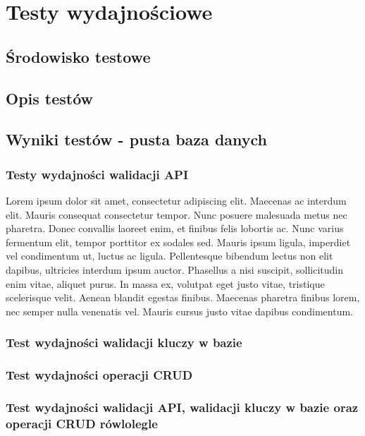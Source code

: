 \chapter{Testy wydajnościowe}
\section{Środowisko testowe}
\section{Opis testów}
\section{Wyniki testów - pusta baza danych}

\newpage
\subsection{Testy wydajności walidacji API}

\clearpage
Lorem ipsum dolor sit amet, consectetur adipiscing elit. Maecenas ac interdum elit. Mauris consequat consectetur tempor. Nunc posuere malesuada metus nec pharetra. Donec convallis laoreet enim, et finibus felis lobortis ac. Nunc varius fermentum elit, tempor porttitor ex sodales sed. Mauris ipsum ligula, imperdiet vel condimentum ut, luctus ac ligula. Pellentesque bibendum lectus non elit dapibus, ultricies interdum ipsum auctor. Phasellus a nisi suscipit, sollicitudin enim vitae, aliquet purus. In massa ex, volutpat eget justo vitae, tristique scelerisque velit. Aenean blandit egestas finibus. Maecenas pharetra finibus lorem, nec semper nulla venenatis vel. Mauris cursus justo vitae dapibus condimentum.


\newpage
\subsection{Test wydajności walidacji kluczy w bazie}

\clearpage

\newpage
\subsection{Test wydajności operacji CRUD}

\clearpage

\newpage
\subsection{Test wydajności walidacji API, walidacji kluczy w bazie oraz operacji CRUD rówlolegle }

\clearpage

